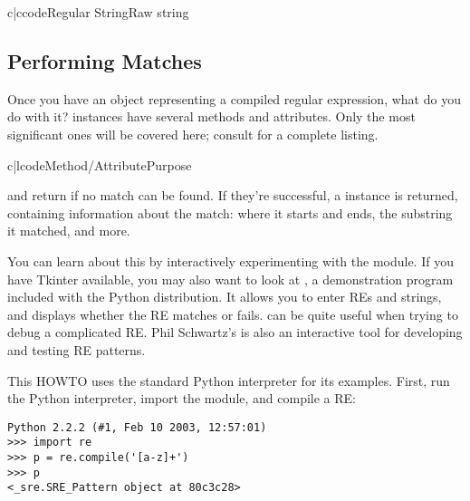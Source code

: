 \documentclass{howto}
\begin{document}
\begin{tableii}{c|c}{code}{Regular String}{Raw string}
\end{tableii}

\subsection{Performing Matches}

Once you have an object representing a compiled regular expression,
what do you do with it?   instances have several
methods and attributes.  Only the most significant ones will be
covered here; consult  for a
complete listing.

\begin{tableii}{c|l}{code}{Method/Attribute}{Purpose}
\end{tableii}

 and  return  if no match
can be found.  If they're successful, a  instance is
returned, containing information about the match: where it starts and
ends, the substring it matched, and more.

You can learn about this by interactively experimenting with the
 module.  If you have Tkinter available, you may also want
to look at , a demonstration program
included with the Python distribution.  It allows you to enter REs and
strings, and displays whether the RE matches or fails.
 can be quite useful when trying to debug a
complicated RE.  Phil Schwartz's
 is also an interactive
tool for developing and testing RE patterns.  

This HOWTO uses the standard Python interpreter for its examples.
First, run the Python interpreter, import the  module, and
compile a RE:

\begin{verbatim}
Python 2.2.2 (#1, Feb 10 2003, 12:57:01)
>>> import re
>>> p = re.compile('[a-z]+')
>>> p
<_sre.SRE_Pattern object at 80c3c28>
\end{verbatim}
\end{document}
